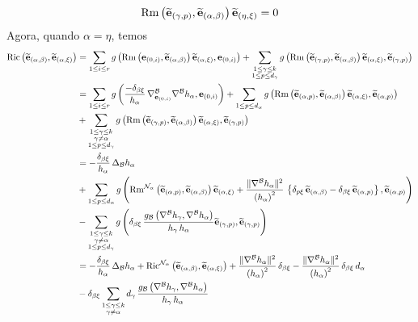 \begin{demm}
\[
 \mathrm{Rm}\left(  \widetilde{\mathbf{e}}_{(\gamma, p)}, \widetilde{\mathbf{e}}_{(\alpha, \beta)} \right) \widetilde{\mathbf{e}}_{(\eta, \xi)} = 0
\]
Agora, quando $\alpha = \eta$, temos
\begin{align*}
\Ric\parent{\bee_{(\alpha, \beta)}, \bee_{(\alpha, \xi)} } &= \sum_{1 \leq i \leq r} g\parent{ \Rm\parent{\be_{(0, i)}, \bee_{(\alpha, \beta)}} \bee_{(\alpha, \xi)}, \be_{(0, i)}} + \sum_{\substack{1 \leq \gamma \leq k \\
1 \leq p \leq d_{\gamma}} } g \parent{ \Rmm{\bee_{(\gamma, p)}}{\bee_{(\alpha, \beta)}}{\bee_{(\alpha, \xi)}}{\bee_{(\gamma, p)}}} \\
&= \sum_{1 \leq i \leq r} g\parent{ \frac{-\delta_{\beta \xi}}{h_{\alpha}} \, \cn^{\bb}_{\be_{(0, i)}} \cn^{\bb} h_{\alpha}, \be_{(0, i)}} + \sum_{1 \leq p \leq d_{\alpha}} g \parent{ \Rmm{\bee_{(\alpha, p)}}{\bee_{(\alpha, \beta)}}{\bee_{(\alpha, \xi)}}{\bee_{(\alpha, p)}}} \\
&+ \sum_{\substack{1 \leq \gamma \leq k \\
\gamma \neq \alpha \\
1 \leq p \leq d_{\gamma}} } g \parent{ \Rmm{\bee_{(\gamma, p)}}{\bee_{(\alpha, \beta)}}{\bee_{(\alpha, \xi)}}{\bee_{(\gamma, p)}}} \\
&=-\frac{\delta_{\beta \xi}}{h_{\alpha}} \, \Delta_{\bb} h_{\alpha} \\
&+ \sum_{1 \leq p \leq d_{\alpha}} g \parent{ \Rm^{\nn_{\alpha}}\parent{ \bee_{(\alpha, p)}, \bee_{(\alpha, \beta)}} \bee_{(\alpha, \xi)} + \frac{\| \cn^{\bb} h_{\alpha} \|^2}{\parent{h_{\alpha}}^2} \, \colch{\delta_{p \xi} \, \bee_{(\alpha, \beta)} - \delta_{\beta \xi} \, \bee_{(\alpha, p)}} , \bee_{(\alpha, p)}  } \\
&-\sum_{\substack{1 \leq \gamma \leq k \\
\gamma \neq \alpha \\
1 \leq p \leq d_{\gamma}} } g \parent{ \delta_{\beta \xi} \, \frac{g_{\bb} \parent{ \cn^{\bb} h_{\gamma}, \cn^{\bb} h_{\alpha}  }}{h_{\gamma} \, h_{\alpha}} \bee_{(\gamma, p)},  \bee_{(\gamma, p)}} \\
&=-\frac{\delta_{\beta \xi}}{h_{\alpha}} \, \Delta_{\bb} h_{\alpha} + \Ric^{\nn_{\alpha}}\parent{ \bee_{(\alpha, \beta)}, \bee_{(\alpha, \xi)} } + \frac{\| \cn^{\bb} h_{\alpha} \|^2}{\parent{h_{\alpha}}^2} \, \delta_{\beta \xi} - \frac{\| \cn^{\bb} h_{\alpha} \|^2}{\parent{h_{\alpha}}^2} \, \delta_{\beta \xi} \, d_{\alpha} \\
&- \delta_{\beta \xi} \sum_{\substack{1 \leq \gamma \leq k \\
\gamma \neq \alpha}} d_{\gamma} \, \frac{g_{\bb} \parent{ \cn^{\bb} h_{\gamma}, \cn^{\bb} h_{\alpha} } }{h_{\gamma} \, h_{\alpha}} \\[1cm]

\end{align*}
\end{demm}
